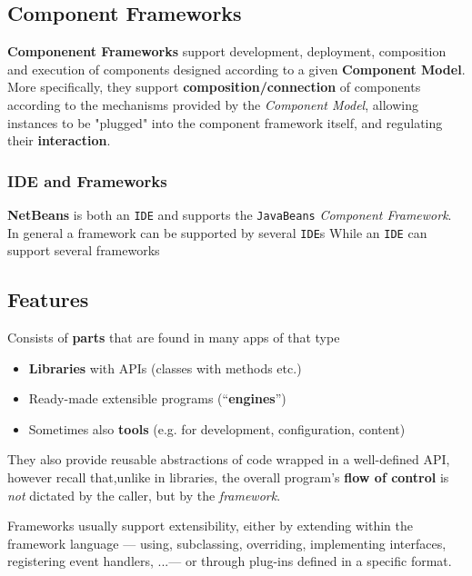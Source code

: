 \subsection{Component Frameworks}
\textbf{Componenent Frameworks} support development, deployment, composition
and execution of components designed according to a given
\textbf{Component Model}.
More specifically, they support \textbf{composition/connection} of components according to
the mechanisms provided by the \textit{Component Model},
allowing instances to be "plugged" into the
component framework itself,
and regulating their \textbf{interaction}.

\subsubsection{IDE and Frameworks}
\textbf{NetBeans} is both an \texttt{IDE} and supports the \texttt{JavaBeans} \textit{Component Framework}.\\
In general a framework can be supported by several \texttt{IDE}s
While an \texttt{IDE} can support several frameworks

\subsection{Features}
Consists of \textbf{parts} that are found in many apps of that type
\begin{itemize}
   \item \textbf{Libraries} with APIs (classes with methods etc.)
   \item Ready-made extensible programs (``\textbf{engines}'')
   \item Sometimes also \textbf{tools} (e.g. for development, configuration,
   content)
\end{itemize}
They also provide reusable abstractions of code wrapped in a well-defined API,
however recall that,unlike in libraries,
the overall program's \textbf{flow of control} is \textit{not} dictated by the caller, but by the \textit{framework}.
\nl

Frameworks usually support extensibility,
either by extending within the framework language {---} using, subclassing, overriding, implementing interfaces, registering event handlers, ...{---} or through plug-ins defined in a specific format.
 

